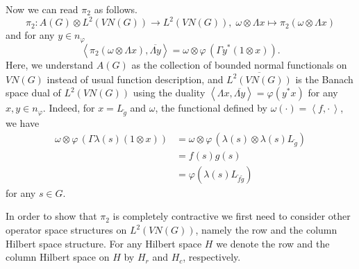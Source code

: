 \documentclass[10pt]{amsart}
\numberwithin{thm}{section}
\numberwithin{equation}{section}
\begin{document}
Now we can read $\pi_2$ as follows.
	\begin{equation}\label{pi2}
	\pi_2 : A(G) \otimes L^2(VN(G)) \rightarrow L^2(VN(G)),\; {\omega} \otimes \Lambda x \mapsto \pi_2({\omega} \otimes \Lambda x)
	\end{equation}
and for any $y\in n_\varphi$
	$$\left\langle \pi_2({\omega} \otimes \Lambda x), \overline{\Lambda y} \right\rangle = {\omega} \otimes \varphi \, (\Gamma y^* (1 \otimes x)).$$
Here, we understand $A(G)$ as the collection of bounded normal functionals on $VN(G)$ instead of usual function description,
and $\overline{L^2(VN(G))}$ is the Banach space dual of $L^2(VN(G))$ using the duality
$\left\langle \Lambda x, \overline{\Lambda y} \right\rangle = \varphi(y^* x)$ for any $x,y\in n_\varphi$.
Indeed, for $x = L_{\check{g}}$ and ${\omega}$, the functional defined by ${\omega}(\cdot) = \left\langle f, \cdot\, \right\rangle$, we have
	\begin{align*}
	{\omega}\otimes \varphi \,(\Gamma \lambda(s) (1\otimes x)) & = {\omega}\otimes \varphi \,(\lambda(s) \otimes \lambda(s) L_{\check{g}} )\\
	& = f(s)g(s)\\
	& = \varphi(\lambda(s)L_{\check{f} \check{g}})
	\end{align*}
for any $s\in G$.

In order to show that $\pi_2$ is completely contractive we first need to consider other operator space structures on $L^2(VN(G))$,
namely the row and the column Hilbert space structure. For any Hilbert space $H$ we denote the row and the column Hilbert space on $H$ by
$H_r$ and $H_c$, respectively.
\end{document}
